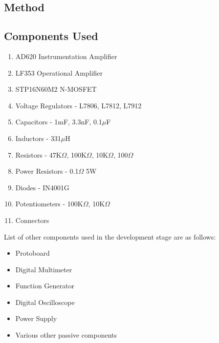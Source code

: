 \documentclass[a4paper,12pt]{article}
\begin{document}
\begin{multicols}{2}
\section{Method}
\subsection{Components Used}
\begin{enumerate}
    \item AD620 Instrumentation Amplifier
    \item LF353 Operational Amplifier
    \item STP16N60M2 N-MOSFET
    \item Voltage Regulators - L7806, L7812, L7912 
    \item Capacitors - 1mF, 3.3nF, 0.1$\mu$F
    \item Inductors - 331$\mu$H
    \item Resistors - 47K$\Omega$, 100K$\Omega$, 10K$\Omega$, 100$\Omega$
    \item Power Resistors - 0.1$\Omega$ 5W
    \item Diodes - IN4001G
    \item Potentiometers - 100K$\Omega$, 10K$\Omega$
    \item Connectors
\end{enumerate}
List of other components used in the development stage are as follows:
\begin{itemize}
    \item Protoboard
    \item Digital Multimeter
    \item Function Generator
    \item Digital Oscilloscope
    \item Power Supply
    \item Various other passive components
\end{itemize}
\end{multicols}
\newpage
\end{document}

